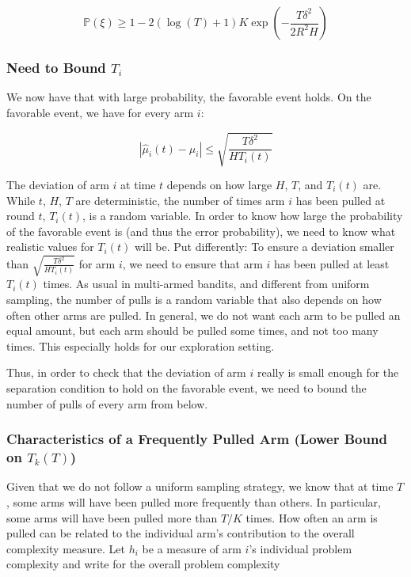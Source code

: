 \documentclass[12pt,]{article}
\begin{document}
\[
\mathbb{P}(\xi) \geq 1 - 2(\log(T) +1)K \exp(-\frac{T\delta^2}{2R^2H})
\]

\subsubsection{\texorpdfstring{Need to Bound
\(T_i\)}{Need to Bound T\_i}}\label{need-to-bound-t_i}

We now have that with large probability, the favorable event holds. On
the favorable event, we have for every arm \(i\):

\[
| \hat{\mu}_i(t) - \mu_i| \leq \sqrt{\frac{T\delta^2}{HT_i(t)}}
\]

The deviation of arm \(i\) at time \(t\) depends on how large \(H\),
\(T\), and \(T_i(t)\) are. While \(t\), \(H\), \(T\) are deterministic,
the number of times arm \(i\) has been pulled at round \(t\),
\(T_i(t)\), is a random variable. In order to know how large the
probability of the favorable event is (and thus the error probability),
we need to know what realistic values for \(T_i(t)\) will be. Put
differently: To ensure a deviation smaller than
\(\sqrt{\frac{T\delta^2}{HT_i(t)}}\) for arm \(i\), we need to ensure
that arm \(i\) has been pulled at least \(T_i(t)\) times. As usual in
multi-armed bandits, and different from uniform sampling, the number of
pulls is a random variable that also depends on how often other arms are
pulled. In general, we do not want each arm to be pulled an equal
amount, but each arm should be pulled some times, and not too many
times. This especially holds for our exploration setting.

Thus, in order to check that the deviation of arm \(i\) really is small
enough for the separation condition to hold on the favorable event, we
need to bound the number of pulls of every arm from below.

\subsubsection{\texorpdfstring{Characteristics of a Frequently Pulled
Arm (Lower Bound on
\(T_k(T)\))}{Characteristics of a Frequently Pulled Arm (Lower Bound on T\_k(T))}}\label{characteristics-of-a-frequently-pulled-arm-lower-bound-on-t_kt}

Given that we do not follow a uniform sampling strategy, we know that at
time \(T\), some arms will have been pulled more frequently than others.
In particular, some arms will have been pulled more than \(T/K\) times.
How often an arm is pulled can be related to the individual arm's
contribution to the overall complexity measure. Let \(h_i\) be a measure
of arm \(i\)'s individual problem complexity and write for the overall
problem complexity
\end{document}
